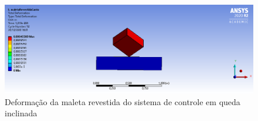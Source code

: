 \begin{apendicesenv}
\begin{figure}[htb]
    \centering
    \includegraphics[width=1.0\textwidth, angle=0]{figuras/estrutura_simulacaoImpacto/maletaRevestidaDeformacaoCanto.png}
    \caption{Deformação da maleta revestida do sistema de controle em queda inclinada}
    \label{fig:simulacaoImpacto_36}
\end{figure}





\end{apendicesenv}

